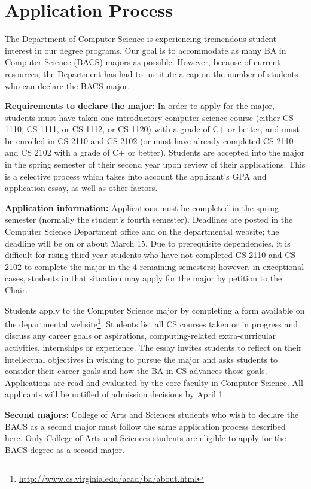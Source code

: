 \documentclass[10pt,letter]{book}
\newcommand{\mysection}[1]{\section{#1}\renewcommand{\rightmark}{#1}}
\newcommand{\myurl}[1]{\footnote{\scriptsize\url{#1}}}
\begin{document}
\mysection{Application Process}
\label{bacsapplicationprocess}

The Department of Computer Science is experiencing tremendous student
interest in our degree programs. Our goal is to accommodate as many BA
in Computer Science (BACS) majors as possible.  However, because of
current resources, the Department has had to institute a cap on the
number of students who can declare the BACS major.


{\bf Requirements to declare the major:} In order to apply for the
major, students must have taken one introductory computer science
course (either CS 1110, CS 1111, or CS 1112, or CS 1120) with a grade
of C+ or better, and must be enrolled in CS 2110 and CS 2102 (or must
have already completed CS 2110 and CS 2102 with a grade of C+ or
better). Students are accepted into the major in the spring semester
of their second year upon review of their applications. This is a
selective process which takes into account the applicant's GPA and
application essay, as well as other factors.

{\bf Application information:} Applications must be completed in the
spring semester (normally the student's fourth semester).  Deadlines
are posted in the Computer Science Department office and on the
departmental website; the deadline will be on or about March 15.  Due
to prerequisite dependencies, it is difficult for rising third year
students who have not completed CS 2110 and CS 2102 to complete the
major in the 4 remaining semesters; however, in exceptional cases,
students in that situation may apply for the major by petition to the
Chair.

Students apply to the Computer Science major by completing a form
available on the departmental
website\myurl{http://www.cs.virginia.edu/acad/ba/about.html}. Students
list all CS courses taken or in progress and discuss any career goals
or aspirations, computing-related extra-curricular activities,
internships or experience. The essay invites students to reflect on
their intellectual objectives in wishing to pursue the major and asks
students to consider their career goals and how the BA in CS advances
those goals. Applications are read and evaluated by the core faculty
in Computer Science. All applicants will be notified of admission
decisions by April 1.

{\bf Second majors:} College of Arts and Sciences students who wish to
declare the BACS as a second major must follow the same application
process described here. Only College of Arts and Sciences students are
eligible to apply for the BACS degree as a second major.
\end{document}
